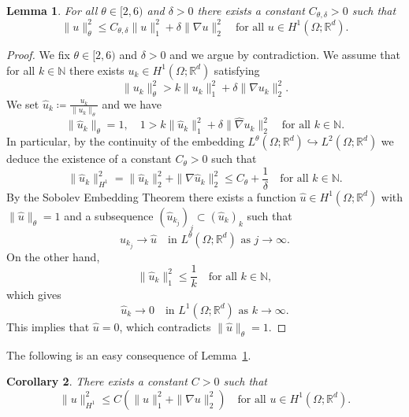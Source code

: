 \documentclass[reqno]{amsart}
\newtheorem{corollary}{Corollary}[section]
\newtheorem{lemma}[corollary]{Lemma}
\theoremstyle{definition}
\numberwithin{equation}{section}
\def\R {\mathbb R}
\def\N {\mathbb N}
\begin{document}
\begin{lemma}\label{lem:Cdelta}
For all $\theta\in[2,6)$ and $\delta>0$ there exists a constant $C_{\theta,\delta}>0$ such that
\begin{equation*}
\|u\|_\theta^2\le C_{\theta,\delta}\|u\|_1^2+\delta\|\nabla u\|_2^2\quad\text{for all $u\in H^1(\Omega;\R^d)$}.
\end{equation*}
\end{lemma}

\begin{proof}
We fix $\theta\in[2,6)$ and $\delta>0$ and we argue by contradiction. We assume that for all $k\in \N$ there exists $u_k\in H^1(\Omega;\R^d)$ satisfying
\begin{equation*}
\|u_k\|_\theta^2> k\|u_k\|_1^2+\delta \|\nabla u_k\|_2^2.
\end{equation*}
We set $\hat u_k\coloneqq \frac{u_k}{\|u_k\|_\theta}$ and we have
\begin{equation*}
\|\hat u_k\|_\theta=1,\quad 1>k\|\hat u_k\|_1^2+\delta\|\hat \nabla u_k\|_2^2\quad\text{for all $k\in\N$}.
\end{equation*}
In particular, by the continuity of the embedding $L^\theta(\Omega;\R^d)\hookrightarrow L^2(\Omega;\R^d)$ we deduce the existence of a constant $C_\theta>0$ such that
$$\|\hat u_k\|_{H^1}^2=\|\hat u_k\|_2^2+\|\nabla \hat u_k\|_2^2\le C_\theta+\frac{1}{\delta}\quad\text{for all $k\in\N$}.$$
By the Sobolev Embedding Theorem there exists a function $\hat u\in H^1(\Omega;\R^d)$ with $\|\hat u\|_\theta=1$ and a subsequence $(\hat u_{k_j})_j\subset (\hat u_k)_k$ such that 
\begin{equation*}
\hat u_{k_j}\to \hat u\quad\text{in $L^\theta(\Omega;\R^d)$ as $j\to\infty$}.
\end{equation*}
On the other hand,
\begin{equation*}
    \|\hat u_k\|_1^2\le \frac{1}{k}\quad\text{for all $k\in\N$},
\end{equation*}
which gives
\begin{equation*}
\hat u_k\to 0\quad\text{in $L^1(\Omega;\R^d)$ as $k\to\infty$}.
\end{equation*}
This implies that $\hat u=0$, which contradicts $\|\hat u\|_\theta=1$.
\end{proof}

The following is an easy consequence of Lemma~\ref{lem:Cdelta}.

\begin{corollary}\label{coro:H1norm}
There exists a constant $C>0$ such that
\begin{equation}\label{eq:H1norm}
\|u\|_{H^1}^2\le C\left(\|u\|_1^2+\|\nabla u\|_2^2\right)\quad\text{for all $u\in H^1(\Omega;\R^d)$}.
\end{equation}
\end{corollary}
\end{document}
